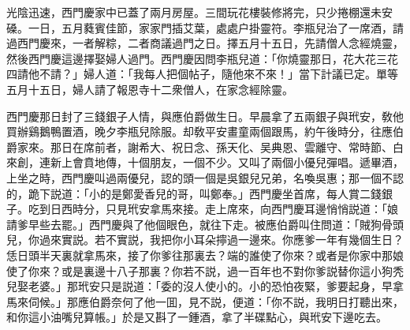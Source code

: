 光陰迅速，西門慶家中已蓋了兩月房屋。三間玩花樓裝修將完，只少捲棚還未安磉。一日，五月蕤賓佳節，家家門插艾葉，處處户掛靈符。李瓶兒治了一席酒，請過西門慶來，一者解粽，二者商議過門之日。擇五月十五日，先請僧人念經燒靈，然後西門慶這邊擇娶婦人過門。西門慶因問李瓶兒道：「你燒靈那日，花大花三花四請他不請？」婦人道：「我每人把個帖子，隨他來不來！」當下計議已定。單等五月十五日，婦人請了報恩寺十二衆僧人，在家念經除靈。

西門慶那日封了三錢銀子人情，與應伯爵做生日。早晨拿了五兩銀子與玳安，敎他買辦鷄鵝鴨置酒，晚夕李瓶兒除服。却敎平安畫童兩個跟馬，約午後時分，往應伯爵家來。那日在席前者，謝希大、祝日念、孫天化、吴典恩、雲離守、常時節、白來創，連新上會賁地傳，十個朋友，一個不少。又叫了兩個小優兒彈唱。遞畢酒，上坐之時，西門慶叫過兩優兒，認的頭一個是吳銀兒兄弟，名喚吳惠；那一個不認的，跪下説道：「小的是鄭愛香兒的哥，叫鄭奉。」西門慶坐首席，每人賞二錢銀子。吃到日西時分，只見玳安拿馬來接。走上席來，向西門慶耳邊悄悄説道：「娘請爹早些去罷。」西門慶與了他個眼色，就往下走。被應伯爵叫住問道：「賊狗骨頭兒，你過來實説。若不實説，我把你小耳朵擰過一邊來。你應爹一年有幾個生日？恁日頭半天裏就拿馬來，接了你爹往那裏去？端的誰使了你來？或者是你家中那娘使了你來？或是裏邊十八子那裏？你若不説，過一百年也不對你爹説替你這小狗秃兒娶老婆。」那玳安只是説道：「委的沒人使小的。小的恐怕夜緊，爹要起身，早拿馬來伺候。」那應伯爵奈何了他一囬，見不説，便道：「你不説，我明日打聽出來，和你這小油嘴兒算帳。」於是又斟了一鍾酒，拿了半碟點心，與玳安下邊吃去。

